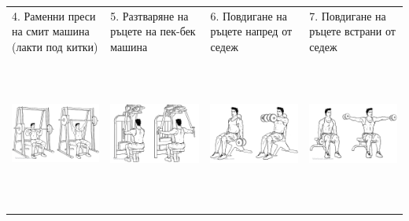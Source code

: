 \documentclass{article}
\begin{document}
\begin{tabular}{ | m{4cm} | m{4cm} | m{4cm} |  m{4cm} | }
\hline
4. Раменни преси на смит машина (лакти под китки) & 
5. Разтваряне на ръцете на пек-бек машина & 
6. Повдигане на ръцете напред от седеж & 
7. Повдигане на ръцете встрани от седеж \\ 
\begin{minipage}{4cm} \includegraphics[width=\linewidth, height=50mm]{Smith_Machine_Shoulder_Press.png} \end{minipage} & 
\begin{minipage}{4cm} \includegraphics[width=\linewidth, height=50mm]{Rear_Delt_Flyes_Machine.png} \end{minipage} &
\begin{minipage}{4cm} \includegraphics[width=\linewidth, height=50mm]{Seated_Dual_Front_Raises.png} \end{minipage} & 
\begin{minipage}{4cm} \includegraphics[width=\linewidth, height=50mm]{Seated_Lateral_Dumbbell_Raise.png} \end{minipage} \\

\end{tabular}
\end{document}

